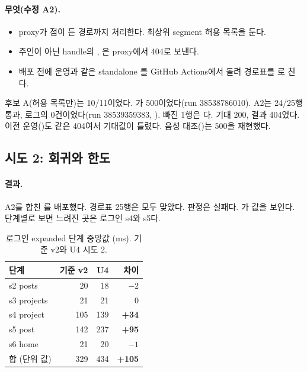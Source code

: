 \paragraph{무엇(수정 A2).}
\begin{itemize}[nosep]
  \item proxy가 점이 든 경로까지 처리한다. 최상위 segment 허용 목록을 둔다.
  \item 주인이 아닌 handle의 , 은 proxy에서 404로 보낸다.
  \item 배포 전에 운영과 같은 standalone 를 GitHub Actions에서 돌려 경로표를 로 친다.
\end{itemize}
후보 A(허용 목록만)는 10/11이었다. 가 500이었다(run 38538786010).
A2는 24/25행 통과, 로그의  0건이었다(run 38539359383,  ).
빠진 1행은 다. 기대 200, 결과 404였다.
이전 운영()도 같은 404여서 기대값이 틀렸다.
음성 대조()는  500을 재현했다.

\subsection{시도 2: 회귀와 한도}\label{sec:re-u4-a2}

\paragraph{결과.}
A2를 합친 를 배포했다. 경로표 25행은 모두 맞았다. 판정은 실패다.
가 값을 보인다. 단계별로 보면 느려진 곳은 로그인 s4와 s5다.
\begin{table}[H]
  \caption{로그인 expanded 단계 중앙값 (ms). 기준 v2와 U4 시도 2.}
  \label{tab:re-u4-steps}
  \centering\small
  \begin{tabularx}{\linewidth}{@{}Y r r r@{}}
    \toprule
    단계 & 기준 v2 & U4 & 차이 \\
    \midrule
    s2 posts & 20 & 18 & $-2$ \\
    \midrule
    s3 projects & 21 & 21 & 0 \\
    \midrule
    s4 project & 105 & 139 & \textbf{+34} \\
    \midrule
    s5 post & 142 & 237 & \textbf{+95} \\
    \midrule
    s6 home & 21 & 20 & $-1$ \\
    \midrule
    합 (단위 값) & 329 & 434 & \textbf{+105} \\
    \bottomrule
  \end{tabularx}
\end{table}

